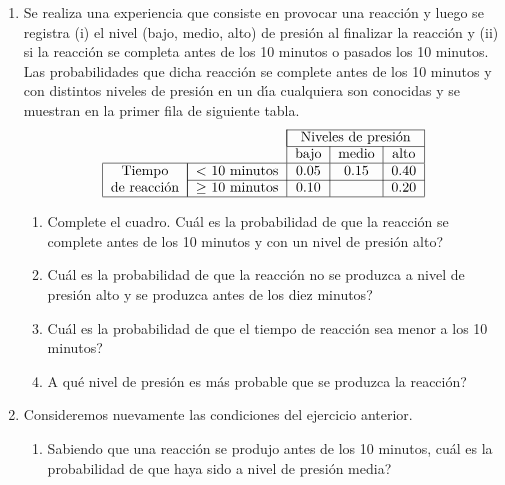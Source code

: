 \documentclass[11pt,a4paper,twoside]{article}%
\begin{document}
\begin{enumerate}
\item Se realiza una experiencia que consiste en provocar una reacci\'{o}n y
luego  se registra  (i) el nivel (bajo, medio, alto) de presi\'{o}n al finalizar la
reacci\'{o}n y (ii) si la reacci\'{o}n se completa antes de
los 10 minutos o pasados los 10 minutos. Las probabilidades que dicha
reacci\'{o}n se complete antes de los 10 minutos y con distintos niveles de
presi\'{o}n en un d\'{\i}a cualquiera son conocidas y se muestran en la primer fila de 
siguiente tabla.\vspace{-0.1cm}%
\[%
\begin{tabular}
[c]{cc|c|c|c|}\cline{3-5}
&  & \multicolumn{3}{|c|}{Niveles de presi\'{o}n}\\\cline{3-5}
&  & bajo & medio & alto\\\hline
\multicolumn{1}{|c|}{Tiempo } & \multicolumn{1}{|c|}{%
	$<$
	10 minutos} & $0.05$ & $0.15$ & $0.40$\\\cline{2-5}%
\multicolumn{1}{|c|}{de reacci\'{o}n} & \multicolumn{1}{|c|}{$\geq$ 10
	minutos} & $0.10$ &  & $0.20$\\\hline
\end{tabular}
\]


\begin{enumerate}
	\item Complete el cuadro. \textquestiondown Cu\'{a}l es la probabilidad de que
	la reacci\'{o}n se complete antes de los 10 minutos y con un nivel de
	presi\'{o}n alto?
	
	
	\item \textquestiondown Cu\'{a}l es la probabilidad de que la reacci\'{o}n no
	se produzca a nivel de presi\'{o}n alto y se produzca antes de los diez minutos?
	
	\item \textquestiondown Cu\'{a}l es la probabilidad de que el tiempo de
	reacci\'{o}n sea menor a los 10 minutos?
	

	\item \textquestiondown A qu\'{e} nivel de presi\'{o}n es m\'{a}s probable que
	se produzca la reacci\'{o}n?
	
%	
\end{enumerate}


\item Consideremos nuevamente las condiciones del ejercicio anterior.
\begin{enumerate} 
	\item Sabiendo que  una reacci\'{o}n
se produjo antes de los 10 minutos,
\textquestiondown cu\'{a}l es la probabilidad de que  haya sido a nivel de presi\'{o}n media?



\end{enumerate}
\end{enumerate}
\end{document}
